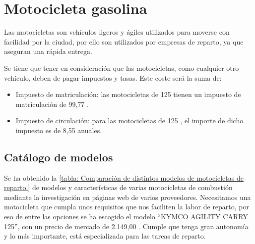 \newpage
\section{Motocicleta gasolina}
\label{anexo_scooter_gasolina}
Las motocicletas son vehículos ligeros y ágiles utilizados para moverse con facilidad por la ciudad, por ello son utilizados por empresas de reparto, ya que aseguran una rápida entrega.

Se tiene que tener en consideración que las motocicletas, como cualquier otro vehículo, deben de pagar impuestos y tasas. Este coste será la suma de:

\begin{itemize}
    \item Impuesto de matriculación: las motocicletas de 125  tienen un impuesto de matriculación de 99,77 .
    \item Impuesto de circulación: para las motocicletas de 125 , el importe de dicho impuesto es de 8,55  anuales.
    
\end{itemize}

\subsection{Catálogo de modelos}

Se ha obtenido la \autoref{tabla: Comparación de distintos modelos de motocicletas de reparto.} de modelos y características de varias motocicletas de combustión mediante la investigación en páginas web de varios proveedores. Necesitamos una motocicleta que cumpla unos requisitos que nos faciliten la labor de reparto, por eso de entre las opciones se ha escogido el modelo “KYMCO AGILITY CARRY 125”, con un precio de mercado de 2.149,00 . Cumple que tenga gran autonomía y lo más importante, está especializada para las tareas de reparto.

